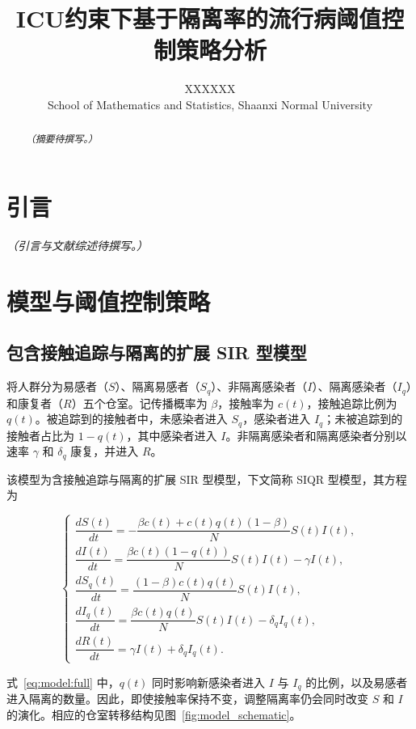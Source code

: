 \documentclass[UTF8,a4paper,10pt,fontset=fandol]{ctexart}
\title{ICU约束下基于隔离率的流行病阈值控制策略分析}
\author{XXX\qquad XXX\\[0.3em]\small School of Mathematics and Statistics, Shaanxi Normal University}
\date{}
\theoremstyle{cnplain}
\theoremstyle{remark}
\numberwithin{equation}{section}
\begin{document}
\maketitle

\begin{abstract}
\textit{（摘要待撰写。）}
\end{abstract}

\section{引言}
\textit{（引言与文献综述待撰写。）}

\section{模型与阈值控制策略}
\label{sec:model}
\subsection{包含接触追踪与隔离的扩展 SIR 型模型}
将人群分为易感者（$S$）、隔离易感者（$S_q$）、非隔离感染者（$I$）、隔离感染者（$I_q$）和康复者（$R$）五个仓室。记传播概率为 $\beta$，接触率为 $c(t)$，接触追踪比例为 $q(t)$。被追踪到的接触者中，未感染者进入 $S_q$，感染者进入 $I_q$；未被追踪到的接触者占比为 $1-q(t)$，其中感染者进入 $I$。非隔离感染者和隔离感染者分别以速率 $\gamma$ 和 $\delta_q$ 康复，并进入 $R$。

该模型为含接触追踪与隔离的扩展 SIR 型模型，下文简称 SIQR 型模型，其方程为


\begin{equation}
\begin{cases}
\dfrac{dS(t)}{dt} = -\dfrac{\beta c(t) + c(t)q(t)(1-\beta)}{N} S(t)I(t), \\[.8em] %
\dfrac{dI(t)}{dt} = \dfrac{\beta c(t)(1-q(t))}{N} S(t)I(t)  - \gamma I(t), \\[.8em]
\dfrac{dS_q(t)}{dt} = \dfrac{(1-\beta)c(t)q(t)}{N} S(t)I(t), \\[.8em]
\dfrac{dI_q(t)}{dt} = \dfrac{\beta c(t) q(t)}{N} S(t)I(t) - \delta_q I_q(t), \\[.8em]
\dfrac{dR(t)}{dt} = \gamma I(t) + \delta_q I_q(t).
\end{cases}
\label{eq:model:full}
\end{equation}

式~\eqref{eq:model:full} 中，$q(t)$ 同时影响新感染者进入 $I$ 与 $I_q$ 的比例，以及易感者进入隔离的数量。因此，即使接触率保持不变，调整隔离率仍会同时改变 $S$ 和 $I$ 的演化。相应的仓室转移结构见图~\ref{fig:model_schematic}。
\end{document}

